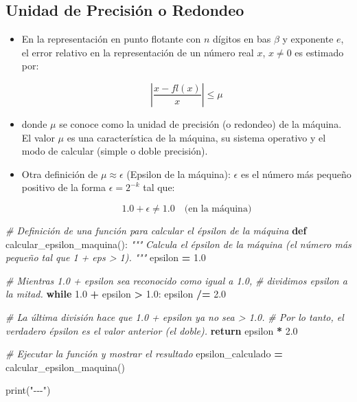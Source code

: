\documentclass[
]{article}
\newenvironment{Shaded}{\begin{snugshade}}{\end{snugshade}}
\newcommand{\BuiltInTok}[1]{#1}
\newcommand{\CommentTok}[1]{\textcolor[rgb]{0.56,0.35,0.01}{\textit{#1}}}
\newcommand{\ControlFlowTok}[1]{\textcolor[rgb]{0.13,0.29,0.53}{\textbf{#1}}}
\newcommand{\FloatTok}[1]{\textcolor[rgb]{0.00,0.00,0.81}{#1}}
\newcommand{\KeywordTok}[1]{\textcolor[rgb]{0.13,0.29,0.53}{\textbf{#1}}}
\newcommand{\NormalTok}[1]{#1}
\newcommand{\OperatorTok}[1]{\textcolor[rgb]{0.81,0.36,0.00}{\textbf{#1}}}
\newcommand{\StringTok}[1]{\textcolor[rgb]{0.31,0.60,0.02}{#1}}
\providecommand{\tightlist}{%
  \setlength{\itemsep}{0pt}\setlength{\parskip}{0pt}}
\begin{document}
\subsection{Unidad de Precisión o
Redondeo}\label{unidad-de-precisiuxf3n-o-redondeo}

\begin{itemize}
\tightlist
\item
  En la representación en punto flotante con \(n\) dígitos en bas
  \(\beta\) y exponente \(e\), el error relativo en la representación de
  un número real \(x\), \(x \neq 0\) es estimado por:

  \[
  \left|\dfrac{x-fl(x)}{x}\right| \leq \mu
  \]
\item
  donde \(\mu\) se conoce como la unidad de precisión (o redondeo) de la
  máquina. El valor \(\mu\) es una característica de la máquina, su
  sistema operativo y el modo de calcular (simple o doble precisión).
\item
  Otra definición de \(\mu \approx \epsilon\) (Epsilon de la máquina):
  \(\epsilon\) es el número más pequeño positivo de la forma
  \(\epsilon = 2^{-k}\) tal que:

  \[
  1.0+\epsilon \neq 1.0 \quad \text{(en la máquina)}
  \]
\end{itemize}

\begin{Shaded}
\begin{Highlighting}[]
\CommentTok{\# Definición de una función para calcular el épsilon de la máquina}
\KeywordTok{def}\NormalTok{ calcular\_epsilon\_maquina():}
    \CommentTok{"""}
\CommentTok{    Calcula el épsilon de la máquina (el número más pequeño tal que 1 + eps \textgreater{} 1).}
\CommentTok{    """}
\NormalTok{    epsilon }\OperatorTok{=} \FloatTok{1.0}
    
    \CommentTok{\# Mientras 1.0 + epsilon sea reconocido como igual a 1.0,}
    \CommentTok{\# dividimos epsilon a la mitad.}
    \ControlFlowTok{while} \FloatTok{1.0} \OperatorTok{+}\NormalTok{ epsilon }\OperatorTok{\textgreater{}} \FloatTok{1.0}\NormalTok{:}
\NormalTok{        epsilon }\OperatorTok{/=} \FloatTok{2.0}
    
    \CommentTok{\# La última división hace que 1.0 + epsilon ya no sea \textgreater{} 1.0.}
    \CommentTok{\# Por lo tanto, el verdadero épsilon es el valor anterior (el doble).}
    \ControlFlowTok{return}\NormalTok{ epsilon }\OperatorTok{*} \FloatTok{2.0}

\CommentTok{\# Ejecutar la función y mostrar el resultado}
\NormalTok{epsilon\_calculado }\OperatorTok{=}\NormalTok{ calcular\_epsilon\_maquina()}

\BuiltInTok{print}\NormalTok{(}\StringTok{"{-}{-}{-}"}\NormalTok{)}
\end{Highlighting}
\end{Shaded}
\end{document}
